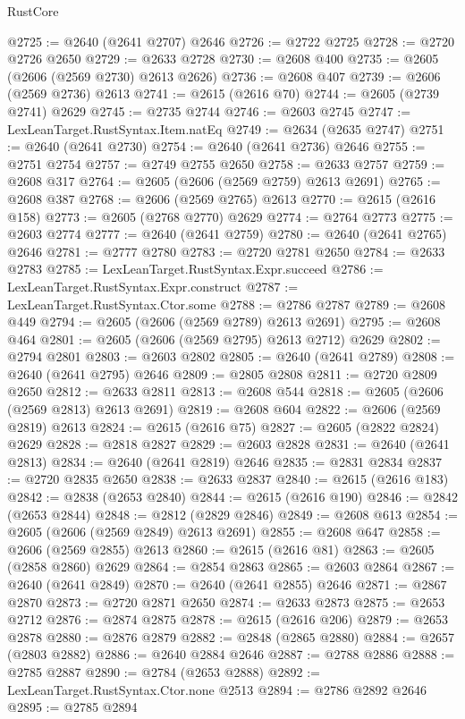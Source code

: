 \begin{lexlean}{RustCore}
\begin{coremodule}
@2725 := @2640 (@2641 @2707) @2646
@2726 := @2722 @2725
@2728 := @2720 @2726 @2650
@2729 := @2633 @2728
@2730 := @2608 @400
@2735 := @2605 (@2606 (@2569 @2730) @2613 @2626)
@2736 := @2608 @407
@2739 := @2606 (@2569 @2736) @2613
@2741 := @2615 (@2616 @70)
@2744 := @2605 (@2739 @2741) @2629
@2745 := @2735 @2744
@2746 := @2603 @2745
@2747 := LexLeanTarget.RustSyntax.Item.natEq
@2749 := @2634 (@2635 @2747)
@2751 := @2640 (@2641 @2730)
@2754 := @2640 (@2641 @2736) @2646
@2755 := @2751 @2754
@2757 := @2749 @2755 @2650
@2758 := @2633 @2757
@2759 := @2608 @317
@2764 := @2605 (@2606 (@2569 @2759) @2613 @2691)
@2765 := @2608 @387
@2768 := @2606 (@2569 @2765) @2613
@2770 := @2615 (@2616 @158)
@2773 := @2605 (@2768 @2770) @2629
@2774 := @2764 @2773
@2775 := @2603 @2774
@2777 := @2640 (@2641 @2759)
@2780 := @2640 (@2641 @2765) @2646
@2781 := @2777 @2780
@2783 := @2720 @2781 @2650
@2784 := @2633 @2783
@2785 := LexLeanTarget.RustSyntax.Expr.succeed
@2786 := LexLeanTarget.RustSyntax.Expr.construct
@2787 := LexLeanTarget.RustSyntax.Ctor.some
@2788 := @2786 @2787
@2789 := @2608 @449
@2794 := @2605 (@2606 (@2569 @2789) @2613 @2691)
@2795 := @2608 @464
@2801 := @2605 (@2606 (@2569 @2795) @2613 @2712) @2629
@2802 := @2794 @2801
@2803 := @2603 @2802
@2805 := @2640 (@2641 @2789)
@2808 := @2640 (@2641 @2795) @2646
@2809 := @2805 @2808
@2811 := @2720 @2809 @2650
@2812 := @2633 @2811
@2813 := @2608 @544
@2818 := @2605 (@2606 (@2569 @2813) @2613 @2691)
@2819 := @2608 @604
@2822 := @2606 (@2569 @2819) @2613
@2824 := @2615 (@2616 @75)
@2827 := @2605 (@2822 @2824) @2629
@2828 := @2818 @2827
@2829 := @2603 @2828
@2831 := @2640 (@2641 @2813)
@2834 := @2640 (@2641 @2819) @2646
@2835 := @2831 @2834
@2837 := @2720 @2835 @2650
@2838 := @2633 @2837
@2840 := @2615 (@2616 @183)
@2842 := @2838 (@2653 @2840)
@2844 := @2615 (@2616 @190)
@2846 := @2842 (@2653 @2844)
@2848 := @2812 (@2829 @2846)
@2849 := @2608 @613
@2854 := @2605 (@2606 (@2569 @2849) @2613 @2691)
@2855 := @2608 @647
@2858 := @2606 (@2569 @2855) @2613
@2860 := @2615 (@2616 @81)
@2863 := @2605 (@2858 @2860) @2629
@2864 := @2854 @2863
@2865 := @2603 @2864
@2867 := @2640 (@2641 @2849)
@2870 := @2640 (@2641 @2855) @2646
@2871 := @2867 @2870
@2873 := @2720 @2871 @2650
@2874 := @2633 @2873
@2875 := @2653 @2712
@2876 := @2874 @2875
@2878 := @2615 (@2616 @206)
@2879 := @2653 @2878
@2880 := @2876 @2879
@2882 := @2848 (@2865 @2880)
@2884 := @2657 (@2803 @2882)
@2886 := @2640 @2884 @2646
@2887 := @2788 @2886
@2888 := @2785 @2887
@2890 := @2784 (@2653 @2888)
@2892 := LexLeanTarget.RustSyntax.Ctor.none @2513
@2894 := @2786 @2892 @2646
@2895 := @2785 @2894

\end{coremodule}
\end{lexlean}
